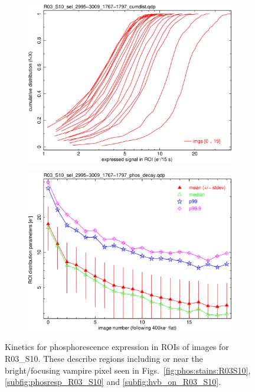 \begin{figure}[!htbp]
\begin{subfigure}{0.45\textwidth}
  \includegraphics[width=\textwidth]{figures/phosphorescence-survey/phos_kinetics/R03_S10_sel_2995-3009_1767-1797_cumdist.png}    
\end{subfigure}
\hfil
\begin{subfigure}{0.45\textwidth}
  \centering
  \includegraphics[width=\textwidth]{figures/phosphorescence-survey/phos_kinetics/R03_S10_sel_2995-3009_1767-1797_phos_decay.png}
\end{subfigure}
\newline
\caption{Kinetics for phosphorescence expression in ROIs of images for R03\_S10. These describe regions including or near the bright/focusing vampire pixel seen in Figs.~\ref{fig:phos:stains:R03S10}, \ref{subfig:phosresp_R03_S10} and \ref{subfig:hvb_on_R03_S10}.}
\label{fig:phos:kinetics:R03S10}
\end{figure}

